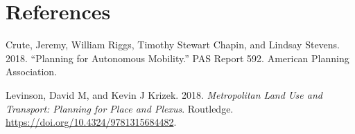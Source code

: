 \documentclass[12pt,]{article}
\begin{document}
\hypertarget{references}{%
\section*{References}\label{references}}

\hypertarget{refs}{}
\leavevmode\hypertarget{ref-APA2018autonomous}{}%
Crute, Jeremy, William Riggs, Timothy Stewart Chapin, and Lindsay
Stevens. 2018. ``Planning for Autonomous Mobility.'' PAS Report 592.
American Planning Association.

\leavevmode\hypertarget{ref-levinson2018metropolitan}{}%
Levinson, David M, and Kevin J Krizek. 2018. \emph{Metropolitan Land Use
and Transport: Planning for Place and Plexus}. Routledge.
\url{https://doi.org/10.4324/9781315684482}.
\end{document}
